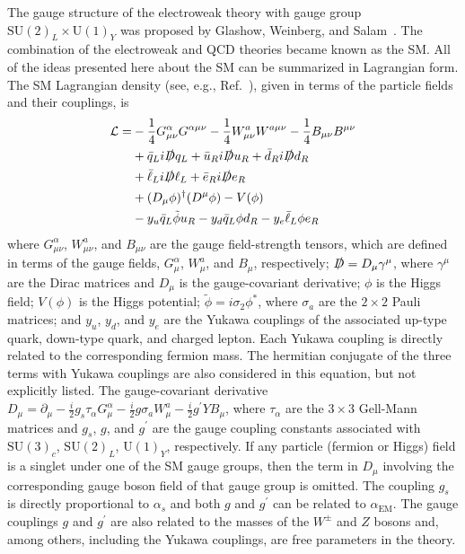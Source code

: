 The gauge structure of the electroweak theory with gauge group $\mathrm{SU}(2)_L \times \mathrm{U}(1)_Y$ was proposed by Glashow, Weinberg, and Salam~\cite{Glashow:1961tr,Weinberg:1967tq,Salam:1968rm}. The combination of the electroweak and QCD theories became known as the SM. All of the ideas presented here about the SM can be summarized in Lagrangian form. The SM Lagrangian density (see, e.g., Ref.~\cite{Halzen:1984mc}), given in terms of the particle fields and their couplings, is
\begin{align}
	\mathcal{L} = &-\frac{1}{4} G_{\mu\nu}^{\alpha}G^{\alpha\mu\nu} -\frac{1}{4} W_{\mu\nu}^aW^{a\mu\nu} -\frac{1}{4} B_{\mu\nu}B^{\mu\nu} \nonumber \\
				  &+\bar{q}_L i \slashed{D} q_L + \bar{u}_R i \slashed{D} u_R + \bar{d}_R i \slashed{D} d_R \nonumber \\
				  &+\bar{\ell}_L i \slashed{D} \ell_L + \bar{e}_R i \slashed{D} e_R \label{eqn:SM_langrangian} \\
				  &+(D_{\mu}\phi)^{\dagger}(D^{\mu}\phi) - V(\phi) \nonumber \\
				  &-y_u\bar{q}_L \tilde{\phi} u_R - y_d\bar{q}_L \phi d_R - y_e\bar{\ell}_L \phi e_R \nonumber
\end{align}
where $G_{\mu\nu}^{\alpha}$, $W_{\mu\nu}^a$, and $B_{\mu\nu}$ are the gauge field-strength tensors, which are defined in terms of the gauge fields, $G_{\mu}^{\alpha}$, $W_{\mu}^a$, and $B_{\mu}$, respectively; $\slashed{D} = D_{\mu}\gamma^{\mu}$, where $\gamma^{\mu}$ are the Dirac matrices and $D_{\mu}$ is the gauge-covariant derivative; $\phi$ is the Higgs field; $V(\phi)$ is the Higgs potential; $\tilde{\phi} = i\sigma_2\phi^{*}$, where $\sigma_a$ are the $2{\times}2$ Pauli matrices; and $y_u$, $y_d$, and $y_e$ are the Yukawa couplings of the associated up-type quark, down-type quark, and charged lepton. Each Yukawa coupling is directly related to the corresponding fermion mass. The hermitian conjugate of the three terms with Yukawa couplings are also considered in this equation, but not explicitly listed. The gauge-covariant derivative $D_{\mu} = \partial_{\mu} - \frac{i}{2}g_s\tau_{\alpha}G_{\mu}^{\alpha} - \frac{i}{2}g\sigma_aW_{\mu}^a - \frac{i}{2}g^{\prime}YB_{\mu}$, where $\tau_{\alpha}$ are the $3{\times}3$ Gell-Mann matrices and $g_s$, $g$, and $g^{\prime}$ are the gauge coupling constants associated with $\mathrm{SU}(3)_c$, $\mathrm{SU}(2)_L$, $\mathrm{U}(1)_Y$, respectively. If any particle (fermion or Higgs) field is a singlet under one of the SM gauge groups, then the term in $D_{\mu}$ involving the corresponding gauge boson field of that gauge group is omitted. The coupling $g_s$ is directly proportional to $\alpha_s$ and both $g$ and $g^{\prime}$ can be related to $\alpha_{\mathrm{EM}}$. The gauge couplings $g$ and $g^{\prime}$ are also related to the masses of the $W^{\pm}$ and $Z$ bosons and, among others, including the Yukawa couplings, are free parameters in the theory.

